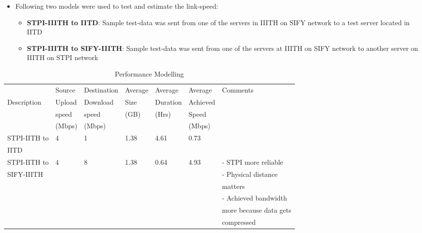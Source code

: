 \documentclass[11pt]{article}
\begin{document}
\begin{itemize}
\item Following two models were used to test and estimate the link-speed:

\begin{itemize}
\item \textbf{STPI-IIITH to IITD}: Sample test-data was sent from one of the
      servers in IIITH on SIFY network to a test server located in IITD
\item \textbf{STPI-IIITH to SIFY-IIITH}: Sample test-data was sent from one
      of the servers at IIITH on SIFY network to another server on
      IIITH on STPI network
\end{itemize}

\end{itemize}
\begin{table}[H]
\caption{\label{tbl: Performance Modelling}Performance Modelling}
\begin{center}
\begin{tabular}{lllllll}
\hline
               &  Source  &  Destination  &  Average  &  Average   &  Average   &  Comments                \\
 Description   &  Upload  &  Download     &  Size     &  Duration  &  Achieved  &                          \\
               &  speed   &  speed        &  (GB)     &  (Hrs)     &  Speed     &                          \\
               &  (Mbps)  &  (Mbps)       &           &            &  (Mbps)    &                          \\
\hline
 STPI-IITH to  &  4       &  1            &  1.38     &  4.61      &  0.73      &                          \\
 IITD          &          &               &           &            &            &                          \\
\hline
 STPI-IITH to  &  4       &  8            &  1.38     &  0.64      &  4.93      &  - STPI more reliable    \\
 SIFY-IIITH    &          &               &           &            &            &  - Physical distance     \\
               &          &               &           &            &            &  matters                 \\
               &          &               &           &            &            &  - Achieved bandwidth    \\
               &          &               &           &            &            &  more because data gets  \\
               &          &               &           &            &            &  compressed              \\
\hline
\end{tabular}
\end{center}
\end{table}
\end{document}
